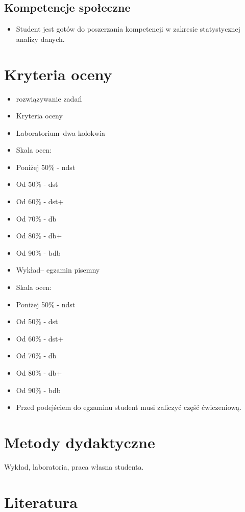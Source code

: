 \documentclass[12pt, a4paper]{article}
\begin{document}
\subsection*{Kompetencje społeczne}
\begin{itemize}
  \item Student jest gotów do poszerzania kompetencji w zakresie statystycznej analizy danych.
\end{itemize}

\section{Kryteria oceny}

\begin{itemize}
  \item rozwiązywanie zadań
  \item Kryteria oceny
  \item Laboratorium–dwa kolokwia
  \item Skala ocen:
  \item Poniżej 50\% - ndst
  \item Od 50\% - dst
  \item Od 60\% - dst+
  \item Od 70\% - db
  \item Od 80\% - db+
  \item Od 90\% - bdb
  \item Wykład– egzamin pisemny
  \item Skala ocen:
  \item Poniżej 50\% - ndst
  \item Od 50\% - dst
  \item Od 60\% - dst+
  \item Od 70\% - db
  \item Od 80\% - db+
  \item Od 90\% - bdb
  \item Przed podejściem do egzaminu student musi zaliczyć część ćwiczeniową.
\end{itemize}

\section{Metody dydaktyczne}

Wykład, laboratoria, praca własna studenta.

\section{Literatura}
\end{document}
